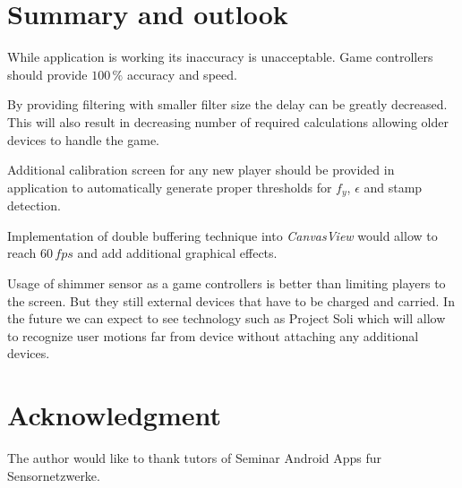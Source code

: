 \documentclass[conference]{IEEEtran}
\begin{document}
\section{Summary and outlook}

While application is working its inaccuracy is unacceptable.
Game controllers should provide $100\,\%$ accuracy and speed.

By providing filtering with smaller filter size the delay can be greatly decreased. This will also result in decreasing number of required calculations allowing older devices to handle the game.

Additional calibration screen for any new player should be provided in application to automatically generate proper thresholds for $f_y$, $\epsilon$ and stamp detection.

Implementation of double buffering technique into \emph{CanvasView} would allow to reach $60\,fps$ and add additional graphical effects.

Usage of shimmer sensor as a game controllers is better than limiting players to the screen. But they still external devices that have to be charged and carried.
In the future we can expect to see technology such as Project Soli which will allow to recognize user motions far from device without attaching any additional devices\cite{ProjectSoli}.


\section*{Acknowledgment}
The author would like to thank tutors of Seminar Android
Apps fur Sensornetzwerke.
\end{document}
